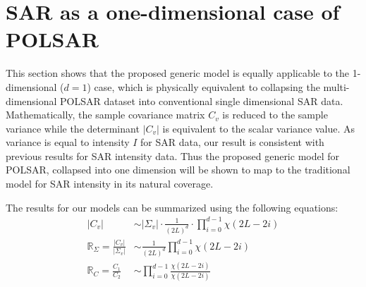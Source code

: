 \documentclass[journal]{IEEEtran}
\begin{document}
\section{SAR as a one-dimensional case of POLSAR}
\label{sec:sar_special_case_of_polsar}

This section shows that the proposed generic model is equally  applicable to the 1-dimensional ($d=1$) case,
  which is physically equivalent to  collapsing the multi-dimensional POLSAR dataset  into conventional single dimensional SAR data.
Mathematically, the sample covariance matrix $C_v$ is reduced to the sample variance while the determinant $|C_v|$ is equivalent to  the scalar variance value.
As variance is equal to intensity $I$ for SAR data, our result is consistent with previous results for SAR intensity data.
Thus the proposed generic model for POLSAR, collapsed into one dimension will be shown to map to the traditional model for SAR intensity in its natural coverage.
  
The results for our models can be summarized using the following equations:
\begin{align*}
  |C_v| &\sim |\Sigma_v| \cdot \frac{1}{(2L)^d} \cdot \prod_{i=0}^{d-1} \chi (2L-2i) \\ %
  \mathbb{R}_{\Sigma} = \frac{|C_v|}{|\Sigma_v|} &\sim \frac{1}{(2L)^d} \prod^{d-1}_{i=0} \chi(2L-2i) \\ %
\mathbb{R}_{C} = \frac{C_1}{C_2} &\sim \prod_{i=0}^{d-1} \frac{\chi(2L-2i)}{\chi(2L-2i)}
\end{align*}
\end{document}
